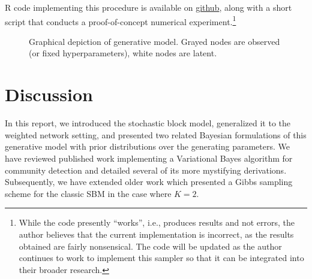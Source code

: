 \documentclass[11pt]{article}   %
\newcommand{\V}[1]{\ensuremath{\boldsymbol{#1}}}
\begin{document}
R code implementing this procedure is available on \href{https://github.com/dankessler/608b-project}{github}, along with a short script that conducts a proof-of-concept numerical experiment.\footnote{While the code presently ``works'', i.e., produces results and not errors, the author believes that the current implementation is incorrect, as the results obtained are fairly nonsensical. The code will be updated as the author continues to work to implement this sampler so that it can be integrated into their broader research.}


\begin{figure}[h]
  \centering
  \caption{Graphical depiction of generative model. Grayed nodes are observed (or fixed hyperparameters), white nodes are latent.}
  \label{fig:plate-overview}
\end{figure}

\section{Discussion}
\label{sec:discussion}


In this report, we introduced the stochastic block model, generalized it to the weighted network setting, and presented two related Bayesian formulations of this generative model with prior distributions over the generating parameters.
We have reviewed published work implementing a Variational Bayes algorithm for community detection and detailed several of its more mystifying derivations.
Subsequently, we have extended older work which presented a Gibbs sampling scheme for the classic SBM in the case where $K=2$.
\end{document}
